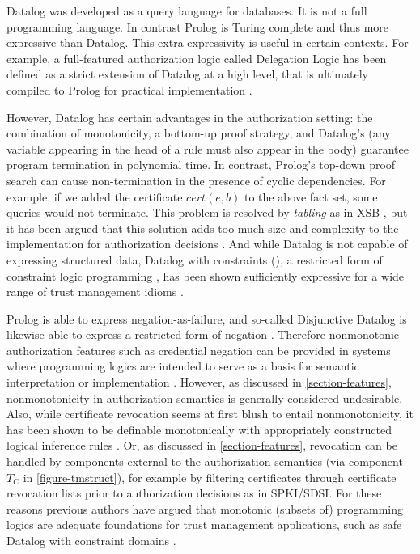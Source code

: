 Datalog was developed as a query language for databases. It is not a full programming language.
In contrast Prolog is Turing complete and thus more expressive than Datalog. This extra
expressivity is useful in certain contexts. For example, a full-featured authorization logic
called Delegation Logic has been defined as a strict extension of Datalog at a high level, that
is ultimately compiled to Prolog for practical implementation \cite{Li:DLLBADA}.

However, Datalog has certain advantages in the authorization setting: the combination of
monotonicity, a bottom-up proof strategy, and Datalog's  (any variable
appearing in the head of a rule must also appear in the body) guarantee program termination in
polynomial time. In contrast, Prolog's top-down proof search can cause non-termination in the
presence of cyclic dependencies. For example, if we added the certificate $\mathit{cert}(e,b)$
to the above fact set, some queries would not terminate. This problem is resolved by
\emph{tabling} as in XSB \cite{xsb-page}, but it has been argued that this solution adds too
much size and complexity to the implementation for authorization decisions \cite{Li:DRBTMF}. And
while Datalog is not capable of expressing structured data, Datalog with constraints
(\datalogc), a restricted form of constraint logic programming \cite{jaffar-maher-jlp94}, has
been shown sufficiently expressive for a wide range of trust management idioms \cite{Li:DCFTML}.

Prolog is able to express negation-as-failure, and so-called Disjunctive Datalog is likewise
able to express a restricted form of negation \cite{eiter-etal-tdbs97}. Therefore nonmonotonic
authorization features such as credential negation can be provided in systems where programming
logics are intended to serve as a basis for semantic interpretation or implementation
\cite{woo93authorizations,bonatti-logicsforauth}. However, as discussed in
\autoref{section-features}, nonmonotonicity in authorization semantics is generally considered
undesirable. Also, while certificate revocation seems at first blush to entail nonmonotonicity,
it has been shown to be definable monotonically with appropriately constructed logical inference
rules \cite{lbi-fc01,Bauer:GFACSW}. Or, as discussed in \autoref{section-features}, revocation
can be handled by components external to the authorization semantics (via component $T_C$ in
\autoref{figure-tmstruct}), for example by filtering certificates through certificate revocation
lists prior to authorization decisions as in SPKI/SDSI. For these reasons previous authors have
argued that monotonic (subsets of) programming logics are adequate foundations for trust
management applications, such as safe Datalog with constraint domains \cite{Li:DCFTML}.

